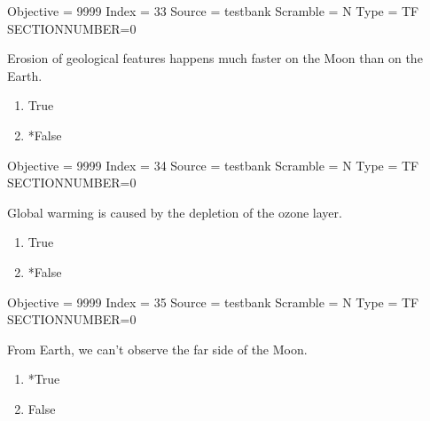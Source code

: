 \documentclass[11pt]{article}
\begin{document}
\begin{enumerate}
\begin{minipage}{\textwidth}
\begin{minipage}{\textwidth}
Objective = 9999
Index = 33
Source = testbank
Scramble = N
Type = TF
SECTIONNUMBER=0
\end{minipage}
\end{minipage}
\vskip 0.20in

\begin{minipage}{\textwidth}
\begin{minipage}{\textwidth}
\item Erosion of geological features happens much faster on the Moon than on the Earth.
\begin{multicols}{3}
\begin{enumerate} 
\setlength{\itemsep}{1pt} 
\setlength{\parskip}{0pt} 
\setlength{\parsep}{0pt}
\setlength{\multicolsep}{1pt} 
\item True
\item *False
\end{enumerate} 
\vfill 
\end{multicols}

Objective = 9999
Index = 34
Source = testbank
Scramble = N
Type = TF
SECTIONNUMBER=0
\end{minipage}
\end{minipage}
\vskip 0.20in

\begin{minipage}{\textwidth}
\begin{minipage}{\textwidth}
\item Global warming is caused by the depletion  of the ozone layer.
\begin{multicols}{3}
\begin{enumerate} 
\setlength{\itemsep}{1pt} 
\setlength{\parskip}{0pt} 
\setlength{\parsep}{0pt}
\setlength{\multicolsep}{1pt} 
\item True
\item *False
\end{enumerate} 
\vfill 
\end{multicols}

Objective = 9999
Index = 35
Source = testbank
Scramble = N
Type = TF
SECTIONNUMBER=0
\end{minipage}
\end{minipage}
\vskip 0.20in

\begin{minipage}{\textwidth}
\begin{minipage}{\textwidth}
\item From Earth, we can't observe the far side of the Moon.
\begin{multicols}{3}
\begin{enumerate} 
\setlength{\itemsep}{1pt} 
\setlength{\parskip}{0pt} 
\setlength{\parsep}{0pt}
\setlength{\multicolsep}{1pt} 
\item *True
\item False
\end{enumerate} 
\vfill 
\end{multicols}


\end{minipage}
\end{minipage}
\end{enumerate}
\end{document}
